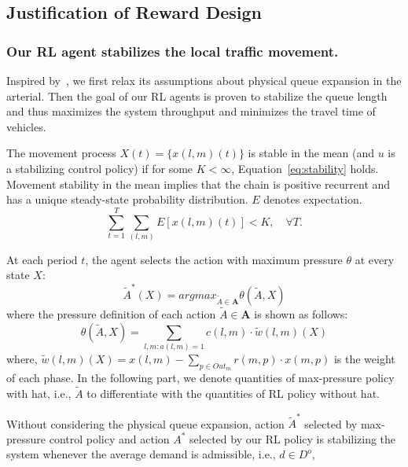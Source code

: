\subsection{Justification of Reward Design}
\subsubsection{Our RL agent stabilizes the local traffic movement.}
Inspired by~\cite{MP13}, we first relax its assumptions about physical queue expansion in the arterial. Then the goal of our RL agents is proven to stabilize the queue length and thus maximizes the system throughput and minimizes the travel time of vehicles.

\theoremstyle{Definition}

\begin{definition} 
The movement process $X(t) = \{x(l, m)(t)\}$ is stable in the mean (and $u$ is a stabilizing control policy) if for
some $K<\infty$, Equation~\ref{eq:stability} holds. Movement stability in the mean implies that the chain is positive recurrent and has a unique steady-state probability distribution. $E$ denotes expectation. 
\begin{equation}
\label{eq:stability}
    \sum_{t=1}^{T}\sum_{(l,m)}E[x(l,m)(t)]<K,\quad\text{$\forall 
   T$.}
\end{equation}
\end{definition}

\begin{definition} 
At each period $t$, the agent selects the action with maximum pressure $\theta$ at every state $X$:
\begin{equation}
\tilde{A}^*(X) = argmax_{\tilde{A}\in \pmb{A}}\theta(\tilde{A}, X)
\end{equation}
where the pressure definition of each action $\tilde{A}\in\pmb{A}$ is shown as follows:
\begin{equation}
\theta(\tilde{A},X) = \sum_{l,m:a(l,m)=1}c(l,m)\cdot \tilde{w}(l,m)(X)
\end{equation}
where, $\tilde{w}(l,m)(X) = x(l,m)-\sum_{p\in Out_m}r(m,p)\cdot x(m,p)$ is the weight of each phase. In the following part, we denote quantities of max-pressure policy with hat, i.e., $\tilde{A}$ to differentiate with the quantities of RL policy without hat.
\end{definition}


\begin{theorem}
\label{theo:stable} Without considering the physical queue expansion, action $\tilde{A}^*$ selected by max-pressure control policy and action $A^*$ selected by our RL policy is stabilizing the system whenever the average demand is admissible, i.e., $d\in D^o$,
\end{theorem}


